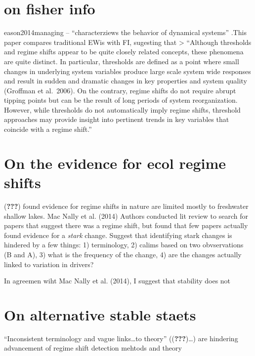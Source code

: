 \documentclass[12pt,twoside,openany]{reedthesis}
\begin{document}
\hypertarget{on-fisher-info}{%
\section{on fisher info}\label{on-fisher-info}}

eason2014managing -- ``characterziews the behavior of dynamical systems'' .This paper compares traditional EWis with FI, sugesting that
\textgreater{} ``Although thresholds and regime shifts appear to be quite closely related concepts, these phenomena are quite distinct. In particular, thresholds are defined as a point where small changes in underlying system variables produce large scale system wide responses and result in sudden and dramatic changes in key properties and system quality (Groffman et al.~2006). On the contrary, regime shifts do not require abrupt tipping points but can be the result of long periods of system reorganization. However, while thresholds do not automatically imply regime shifts, threshold approaches may provide insight into pertinent trends in key variables that coincide with a regime shift.''

\hypertarget{on-the-evidence-for-ecol-regime-shifts}{%
\section{On the evidence for ecol regime shifts}\label{on-the-evidence-for-ecol-regime-shifts}}

({\textbf{???}}) found evidence for regime shifts in nature are limited mostly to freshwater shallow lakes.
Mac Nally et al. (2014) Authors conducted lit review to search for papers that suggest there was a regime shift, but found that few papers actually found evidence for a \emph{stark} change. Suggest that identifying stark changes is hindered by a few things: 1) terminology, 2) calims based on two obvservations (B and A), 3) what is the frequency of the change, 4) are the changes actually linked to variation in drivers?

In agreemen wiht Mac Nally et al. (2014), I suggest that stability does not

\hypertarget{on-alternative-stable-staets}{%
\section{On alternative stable staets}\label{on-alternative-stable-staets}}

``Inconsistent terminology and vague links\ldots{}to theory'' (({\textbf{???}})\ldots{}) are hindering advancement of regime shift detection mehtods and theory
\end{document}
